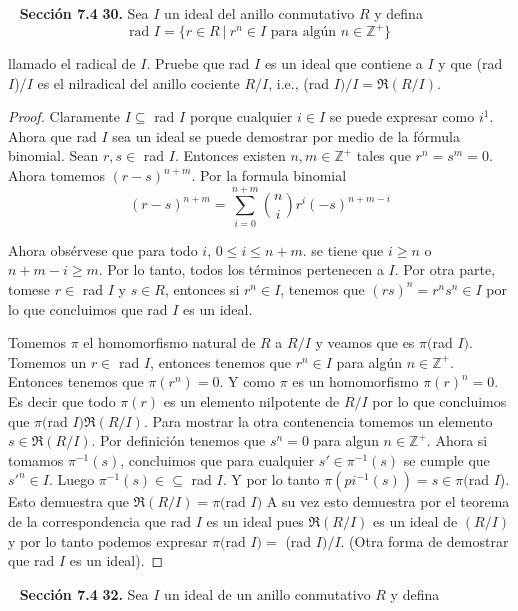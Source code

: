 \documentclass[letter,twoside,12pt]{article}
\begin{document}
\newpage
\mbox{ }
\newpage
\textbf{Secci\'on 7.4} \textbf{30.} Sea $I$ un ideal del anillo conmutativo $R$ y defina
\begin{equation}
\text{rad }I=\{r  \in R\:|\:r^n \in I\text{ para alg\'un } n \in \mathbb{Z}^+ \} \nonumber
\end{equation}

llamado el radical de $I$. Pruebe que rad $I$ es un ideal que contiene a $I$ y que (rad $I$)/$I$ es el nilradical del anillo cociente $R/I$, i.e., (rad $I)/I=\mathfrak{R}(R/I)$.
\begin{proof}
Claramente $I \subseteq$ rad $I$ porque cualquier $i \in I$ se puede expresar como $i^{1}$. Ahora que rad $I$ sea un ideal se puede demostrar por medio de la f\'ormula binomial. Sean $r,s \in $ rad $I$. Entonces existen $n,m \in \mathbb{Z}^+$ tales que $r^n=s^m=0$. Ahora tomemos $(r-s)^{n+m}$. Por la formula binomial
\begin{equation}
(r-s)^{n+m}=\sum_{i=0}^{n+m} {n \choose i}r^i(-s)^{n+m-i} \nonumber
\end{equation}

Ahora obs\'ervese que para todo $i$, $0\leq i \leq n+m$. se tiene que $i\geq n$ o $n+m-i\geq m$. Por lo tanto, todos los t\'erminos pertenecen a $I$. Por otra parte, tomese $r \in $ rad $I$ y $s \in R$, entonces si $r^n \in I$, tenemos que $(rs)^n =r^ns^n \in I$ por lo que concluimos que rad $I$ es un ideal.
 
Tomemos $\pi$ el homomorfismo natural de $R$ a $R/I$ y veamos que es $\pi($rad $I)$. Tomemos un $r\in$ rad $I$, entonces tenemos que $r^n \in I$ para alg\'un $n \in \mathbb{Z}^+$. Entonces tenemos que $\pi(r^n)=0$. Y como $\pi$ es un homomorfismo $\pi(r)^n=0$. Es decir que todo $\pi(r)$ es un elemento nilpotente de $R/I$ por lo que concluimos que $\pi($rad $I)\mathfrak{R}(R/I)$. Para mostrar la otra contenencia tomemos un elemento $s \in \mathfrak{R}(R/I)$. Por definici\'on tenemos que $s^n = 0$ para algun $n \in \mathbb{Z}^+$. Ahora si tomamos $\pi^{-1}(s)$, concluimos que para cualquier $s' \in \pi^{-1}(s)$ se cumple que $s'^n \in I$. Luego $\pi^{-1}(s) \in \subseteq $ rad $I$. Y por lo tanto $\pi(pi^{-1}(s))=s \in \pi($rad $I$). Esto demuestra que $\mathfrak{R}(R/I)=\pi($rad $I)$ A su vez esto demuestra por el teorema de la correspondencia que rad $I$ es un ideal pues $\mathfrak{R}(R/I)$ es un ideal de $(R/I)$ y por lo tanto podemos expresar $\pi($rad $I)=$ (rad $I)/I$. (Otra forma de demostrar que rad $I$ es un ideal).
\end{proof}
\newpage
\mbox{ }
\newpage
\textbf{Secci\'on 7.4} \textbf{32.} Sea $I$ un ideal de un anillo conmutativo $R$ y defina
\end{document}
